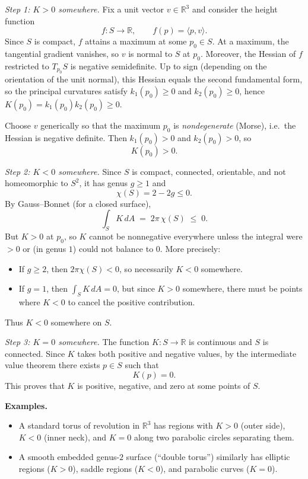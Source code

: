 \begin{solution}
\textit{Step 1: $K>0$ somewhere.}
	Fix a unit vector $v\in\mathbb{R}^3$ and consider the height function
	\[
	f:S\to\mathbb{R},\qquad f(p)=\langle p,v\rangle .
	\]
	Since $S$ is compact, $f$ attains a maximum at some $p_0\in S$.
	At a maximum, the tangential gradient vanishes, so $v$ is normal to $S$ at $p_0$.
	Moreover, the Hessian of $f$ restricted to $T_{p_0}S$ is negative semidefinite.
	Up to sign (depending on the orientation of the unit normal), this Hessian equals the second fundamental form,
	so the principal curvatures satisfy $k_1(p_0)\ge 0$ and $k_2(p_0)\ge 0$, hence $K(p_0)=k_1(p_0)k_2(p_0)\ge 0$.
	
	Choose $v$ generically so that the maximum $p_0$ is \emph{nondegenerate} (Morse), i.e.\ the Hessian is negative definite.
	Then $k_1(p_0)>0$ and $k_2(p_0)>0$, so
	\[
	K(p_0)>0.
	\]
	
	\textit{Step 2: $K<0$ somewhere.}
	Since $S$ is compact, connected, orientable, and not homeomorphic to $S^2$, it has genus $g\ge 1$ and
	\[
	\chi(S)=2-2g\le 0.
	\]
	By Gauss--Bonnet (for a closed surface),
	\[
	\int_S K\,dA \;=\; 2\pi\,\chi(S)\;\le\;0.
	\]
	But $K>0$ at $p_0$, so $K$ cannot be nonnegative everywhere unless the integral were $>0$ or (in genus $1$) could not balance to $0$.
	More precisely:
	\begin{itemize}
		\item If $g\ge 2$, then $2\pi\chi(S)<0$, so necessarily $K<0$ somewhere.
		\item If $g=1$, then $\int_S K\,dA=0$, but since $K>0$ somewhere, there must be points where $K<0$ to cancel the positive contribution.
	\end{itemize}
	Thus $K<0$ somewhere on $S$.
	
	\textit{Step 3: $K=0$ somewhere.}
	The function $K:S\to\mathbb{R}$ is continuous and $S$ is connected.
	Since $K$ takes both positive and negative values, by the intermediate value theorem there exists $p\in S$ such that
	\[
	K(p)=0.
	\]
	This proves that $K$ is positive, negative, and zero at some points of $S$.
	
	\par\medskip\noindent\textbf{Examples.}\par\smallskip

	\begin{itemize}
		\item A standard torus of revolution in $\mathbb{R}^3$ has regions with $K>0$ (outer side), $K<0$ (inner neck),
		and $K=0$ along two parabolic circles separating them.
		\item A smooth embedded genus-$2$ surface (``double torus'') similarly has elliptic regions ($K>0$), saddle regions ($K<0$),
		and parabolic curves ($K=0$).
	\end{itemize}
\end{solution}

